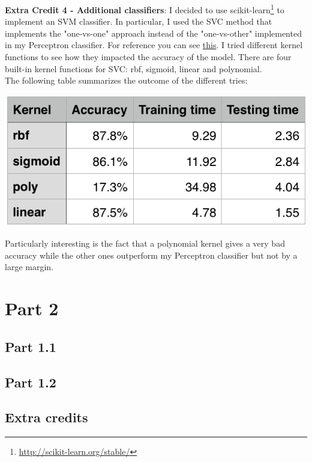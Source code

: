 \documentclass[11pt]{article}
\begin{document}
\textbf{Extra Credit 4 - Additional classifiers}: I decided to use scikit-learn\footnote{\url{http://scikit-learn.org/stable/}} to implement an SVM classifier. In particular, I used the SVC method that implements the "one-vs-one" approach instead of the "one-vs-other" implemented in my Perceptron classifier. For reference you can see \href{http://scikit-learn.org/stable/modules/generated/sklearn.svm.SVC.html#sklearn.svm.SVC}{this}. I tried different kernel functions to see how they impacted the accuracy of the model. There are four built-in kernel functions for SVC: rbf, sigmoid, linear and polynomial. \\

The following table summarizes the outcome of the different tries:
\begin{center}
\includegraphics[scale=0.80]{part1.ec4/summary.png}
\end{center}

Particularly interesting is the fact that a polynomial kernel gives a very bad accuracy while the other ones outperform my Perceptron classifier but not by a large margin.

\section*{Part 2}

\subsection*{Part 1.1}

\subsection*{Part 1.2}

\subsection*{Extra credits}
\end{document}
